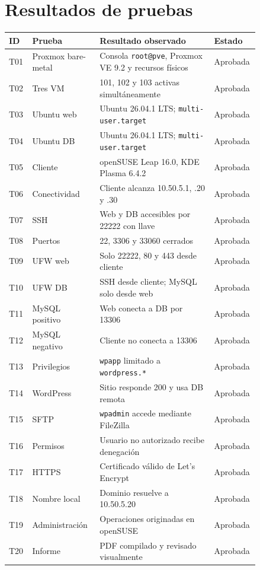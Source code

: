 \section{Resultados de pruebas}

\small
\begin{longtable}{p{0.055\linewidth}p{0.25\linewidth}p{0.43\linewidth}p{0.10\linewidth}}
\toprule
\textbf{ID} & \textbf{Prueba} & \textbf{Resultado observado} & \textbf{Estado} \\
\midrule
\endhead
T01 & Proxmox bare-metal & Consola \texttt{root@pve}, Proxmox VE 9.2 y recursos físicos & Aprobada \\
T02 & Tres VM & 101, 102 y 103 activas simultáneamente & Aprobada \\
T03 & Ubuntu web & Ubuntu 26.04.1 LTS; \texttt{multi-user.target} & Aprobada \\
T04 & Ubuntu DB & Ubuntu 26.04.1 LTS; \texttt{multi-user.target} & Aprobada \\
T05 & Cliente & openSUSE Leap 16.0, KDE Plasma 6.4.2 & Aprobada \\
T06 & Conectividad & Cliente alcanza 10.50.5.1, .20 y .30 & Aprobada \\
T07 & SSH & Web y DB accesibles por 22222 con llave & Aprobada \\
T08 & Puertos & 22, 3306 y 33060 cerrados & Aprobada \\
T09 & UFW web & Solo 22222, 80 y 443 desde cliente & Aprobada \\
T10 & UFW DB & SSH desde cliente; MySQL solo desde web & Aprobada \\
T11 & MySQL positivo & Web conecta a DB por 13306 & Aprobada \\
T12 & MySQL negativo & Cliente no conecta a 13306 & Aprobada \\
T13 & Privilegios & \texttt{wpapp} limitado a \texttt{wordpress.*} & Aprobada \\
T14 & WordPress & Sitio responde 200 y usa DB remota & Aprobada \\
T15 & SFTP & \texttt{wpadmin} accede mediante FileZilla & Aprobada \\
T16 & Permisos & Usuario no autorizado recibe denegación & Aprobada \\
T17 & HTTPS & Certificado válido de Let's Encrypt & Aprobada \\
T18 & Nombre local & Dominio resuelve a 10.50.5.20 & Aprobada \\
T19 & Administración & Operaciones originadas en openSUSE & Aprobada \\
T20 & Informe & PDF compilado y revisado visualmente & Aprobada \\
\bottomrule
\end{longtable}
\normalsize

